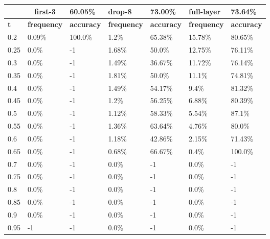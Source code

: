 
\begin{table}[t]
\centering
\begin{tabular}{lllllll}
\hline
\multicolumn{1}{c}{} & \multicolumn{1}{c}{first-3} & \multicolumn{1}{l|}{60.05\%} & drop-8 & \multicolumn{1}{l|}{73.00\%} & full-layer & 73.64\% \\ \hline
\multicolumn{1}{l|}{\textbf{t}} & \textbf{frequency} & \multicolumn{1}{l|}{\textbf{accuracy}} & \textbf{frequency} & \multicolumn{1}{l|}{\textbf{accuracy}} & \textbf{frequency} & \textbf{accuracy} \\ \hline	\multicolumn{1}{l|}{0.2}&  0.09\% & \multicolumn{1}{l|}{100.0\%}& 1.2\% & \multicolumn{1}{l|}{65.38\%}& 15.78\% & 80.65\%\\ 
\multicolumn{1}{l|}{0.25}&  0.0\% & \multicolumn{1}{l|}{-1}& 1.68\% & \multicolumn{1}{l|}{50.0\%}& 12.75\% & 76.11\%\\ 
\multicolumn{1}{l|}{0.3}&  0.0\% & \multicolumn{1}{l|}{-1}& 1.49\% & \multicolumn{1}{l|}{36.67\%}& 11.72\% & 76.14\%\\ 
\multicolumn{1}{l|}{0.35}&  0.0\% & \multicolumn{1}{l|}{-1}& 1.81\% & \multicolumn{1}{l|}{50.0\%}& 11.1\% & 74.81\%\\ 
\multicolumn{1}{l|}{0.4}&  0.0\% & \multicolumn{1}{l|}{-1}& 1.49\% & \multicolumn{1}{l|}{54.17\%}& 9.4\% & 81.32\%\\ 
\multicolumn{1}{l|}{0.45}&  0.0\% & \multicolumn{1}{l|}{-1}& 1.2\% & \multicolumn{1}{l|}{56.25\%}& 6.88\% & 80.39\%\\ 
\multicolumn{1}{l|}{0.5}&  0.0\% & \multicolumn{1}{l|}{-1}& 1.12\% & \multicolumn{1}{l|}{58.33\%}& 5.54\% & 87.1\%\\ 
\multicolumn{1}{l|}{0.55}&  0.0\% & \multicolumn{1}{l|}{-1}& 1.36\% & \multicolumn{1}{l|}{63.64\%}& 4.76\% & 80.0\%\\ 
\multicolumn{1}{l|}{0.6}&  0.0\% & \multicolumn{1}{l|}{-1}& 1.18\% & \multicolumn{1}{l|}{42.86\%}& 2.15\% & 71.43\%\\ 
\multicolumn{1}{l|}{0.65}&  0.0\% & \multicolumn{1}{l|}{-1}& 0.68\% & \multicolumn{1}{l|}{66.67\%}& 0.4\% & 100.0\%\\ 
\multicolumn{1}{l|}{0.7}&  0.0\% & \multicolumn{1}{l|}{-1}& 0.0\% & \multicolumn{1}{l|}{-1}& 0.0\% & -1\\ 
\multicolumn{1}{l|}{0.75}&  0.0\% & \multicolumn{1}{l|}{-1}& 0.0\% & \multicolumn{1}{l|}{-1}& 0.0\% & -1\\ 
\multicolumn{1}{l|}{0.8}&  0.0\% & \multicolumn{1}{l|}{-1}& 0.0\% & \multicolumn{1}{l|}{-1}& 0.0\% & -1\\ 
\multicolumn{1}{l|}{0.85}&  0.0\% & \multicolumn{1}{l|}{-1}& 0.0\% & \multicolumn{1}{l|}{-1}& 0.0\% & -1\\ 
\multicolumn{1}{l|}{0.9}&  0.0\% & \multicolumn{1}{l|}{-1}& 0.0\% & \multicolumn{1}{l|}{-1}& 0.0\% & -1\\ 
\multicolumn{1}{l|}{0.95}&  -1 & \multicolumn{1}{l|}{-1}& 0.0\% & \multicolumn{1}{l|}{-1}& 0.0\% & -1\\ 


\end{tabular}
\end{table}
